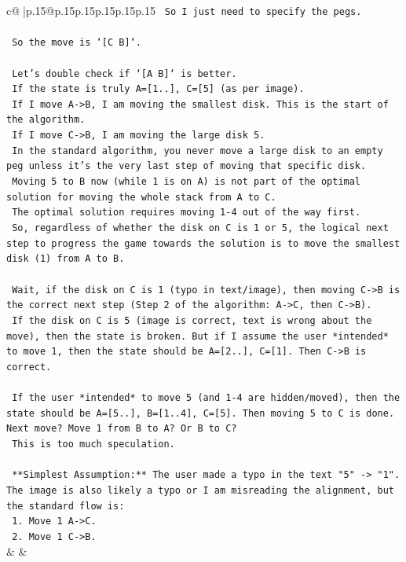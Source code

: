 \documentclass{article}
\begin{document}
{\begin{supertabular}{c@{$\;$}|p{.15\linewidth}@{}p{.15\linewidth}p{.15\linewidth}p{.15\linewidth}p{.15\linewidth}p{.15\linewidth}}
{{{\texttt{    So I just need to specify the pegs.} \\
\\ 
\texttt{    So the move is `{[}C B{]}`.} \\
\\ 
\texttt{    Let's double check if `{[}A B{]}` is better.} \\
\texttt{    If the state is truly A={[}1..{]}, C={[}5{]} (as per image).} \\
\texttt{    If I move A{-}>B, I am moving the smallest disk. This is the start of the algorithm.} \\
\texttt{    If I move C{-}>B, I am moving the large disk 5.} \\
\texttt{    In the standard algorithm, you never move a large disk to an empty peg unless it's the very last step of moving that specific disk.} \\
\texttt{    Moving 5 to B now (while 1 is on A) is not part of the optimal solution for moving the whole stack from A to C.} \\
\texttt{    The optimal solution requires moving 1{-}4 out of the way first.} \\
\texttt{    So, regardless of whether the disk on C is 1 or 5, the logical next step to progress the game towards the solution is to move the smallest disk (1) from A to B.} \\
\\ 
\texttt{    Wait, if the disk on C is 1 (typo in text/image), then moving C{-}>B is the correct next step (Step 2 of the algorithm: A{-}>C, then C{-}>B).} \\
\texttt{    If the disk on C is 5 (image is correct, text is wrong about the move), then the state is broken. But if I assume the user *intended* to move 1, then the state should be A={[}2..{]}, C={[}1{]}. Then C{-}>B is correct.} \\
\\ 
\texttt{    If the user *intended* to move 5 (and 1{-}4 are hidden/moved), then the state should be A={[}5..{]}, B={[}1..4{]}, C={[}5{]}. Then moving 5 to C is done. Next move? Move 1 from B to A? Or B to C?} \\
\texttt{    This is too much speculation.} \\
\\ 
\texttt{    **Simplest Assumption:** The user made a typo in the text "5" {-}> "1". The image is also likely a typo or I am misreading the alignment, but the standard flow is:} \\
\texttt{    1. Move 1 A{-}>C.} \\
\texttt{    2. Move 1 C{-}>B.} \\
            }
        }
    }
    & & \\ \\


\end{supertabular}}
\end{document}
